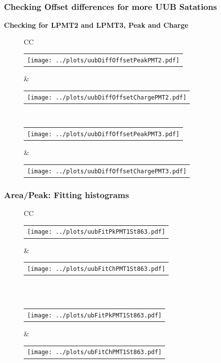 \documentclass[aspectratio=169]{beamer}
\begin{document}
\begin{frame}
	\frametitle{Checking Offset differences for more UUB Satations}
	{\bf Checking for LPMT2 and LPMT3, Peak and Charge}
	\begin{figure}
		\centering
		\begin{tabularx}{\textwidth}{CC}
			\begin{tabular}{l}
				\texttt{[image: ../plots/uubDiffOffsetPeakPMT2.pdf]}
			\end{tabular}
			&
			\begin{tabular}{l}
				\texttt{[image: ../plots/uubDiffOffsetChargePMT2.pdf]}
			\end{tabular}
			\\
			\begin{tabular}{l}
				\texttt{[image: ../plots/uubDiffOffsetPeakPMT3.pdf]}
			\end{tabular}
			&
			\begin{tabular}{l}
				\texttt{[image: ../plots/uubDiffOffsetChargePMT3.pdf]}
			\end{tabular}
		\end{tabularx}
	\end{figure}
\end{frame}



\begin{frame}
	\frametitle{Area/Peak: Fitting histograms}
	\begin{figure}
		\centering
		\begin{tabularx}{\textwidth}{CC}
			\\
			\begin{tabular}{l}
				\texttt{[image: ../plots/uubFitPkPMT1St863.pdf]}
			\end{tabular}
			&
			\begin{tabular}{l}
				\texttt{[image: ../plots/uubFitChPMT1St863.pdf]}
			\end{tabular}
			\\
			\\
			\begin{tabular}{l}
				\texttt{[image: ../plots/ubFitPkPMT1St863.pdf]}
			\end{tabular}
			&
			\begin{tabular}{l}
				\texttt{[image: ../plots/ubFitChPMT1St863.pdf]}
			\end{tabular}
		\end{tabularx}
	\end{figure}
\end{frame}
\end{document}
